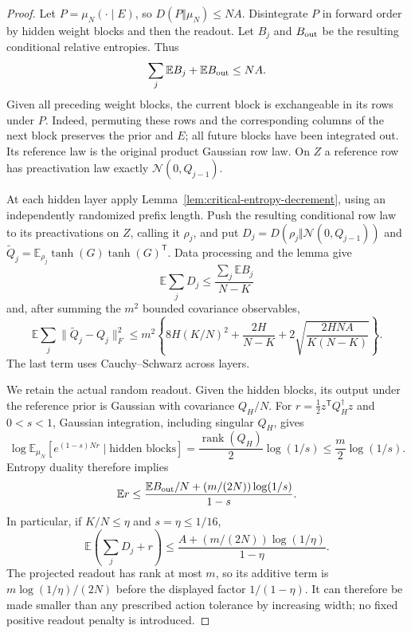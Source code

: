 \begin{proof}
Let $P=\mu_N(\cdot\mid E)$, so $D(P\Vert\mu_N)\le NA$.
Disintegrate $P$ in forward order by hidden weight blocks and then
the readout. Let $B_j$ and $B_{\rm out}$ be the resulting conditional
relative entropies. Thus
\[
 \sum_j\mathbb E B_j+\mathbb E B_{\rm out}\le NA.
\]
Given all preceding weight blocks, the current block is exchangeable
in its rows under $P$. Indeed, permuting these rows and the corresponding
columns of the next block preserves the prior and $E$; all future
blocks have been integrated out. Its reference law is the original
product Gaussian row law. On $Z$ a reference row has preactivation
law exactly $\mathcal N(0,Q_{j-1})$.

At each hidden layer apply Lemma~\ref{lem:critical-entropy-decrement},
using an independently randomized prefix length. Push the resulting
conditional row law to its preactivations on $Z$, calling it $\rho_j$,
and put $D_j=D(\rho_j\Vert\mathcal N(0,Q_{j-1}))$ and
$\widetilde Q_j=\mathbb E_{\rho_j}\tanh(G)\tanh(G)^{\mathsf T}$.
Data processing and the lemma give
\[
 \mathbb E\sum_j D_j\le\frac{\sum_j\mathbb E B_j}{N-K}
\]
and, after summing the $m^2$ bounded covariance observables,
\begin{equation}\label{eq:critical-finite-witness-moment-sum}
 \mathbb E\sum_j\|\widetilde Q_j-Q_j\|_F^2
 \le m^2\left\{8H(K/N)^2+\frac{2H}{N-K}
               +2\sqrt{\frac{2HNA}{K(N-K)}}\right\}.
\end{equation}
The last term uses Cauchy--Schwarz across layers.

We retain the actual random readout. Given the hidden blocks, its
output under the reference prior is Gaussian with covariance $Q_H/N$.
For $r=\tfrac12z^{\mathsf T}Q_H^\dagger z$ and $0<s<1$,
Gaussian integration, including singular $Q_H$, gives
\[
 \log\mathbb E_{\mu_N}\left[e^{(1-s)Nr}\mid\text{hidden blocks}\right]
 =\frac{\operatorname{rank}(Q_H)}2\log(1/s)
 \le\frac m2\log(1/s).
\]
Entropy duality therefore implies
\[
 \mathbb E r\le
 \frac{\mathbb E B_{\rm out}/N+(m/(2N))\log(1/s)}{1-s}.
\]
In particular, if $K/N\le\eta$ and $s=\eta\le1/16$,
\begin{equation}\label{eq:critical-finite-witness-action-mean}
 \mathbb E\left(\sum_jD_j+r\right)
 \le\frac{A+(m/(2N))\log(1/\eta)}{1-\eta}.
\end{equation}
The projected readout has rank at most $m$, so its additive term is
$m\log(1/\eta)/(2N)$ before the displayed factor $1/(1-\eta)$.
It can therefore be made smaller than any prescribed action tolerance
by increasing width; no fixed positive readout penalty is introduced.


\end{proof}
